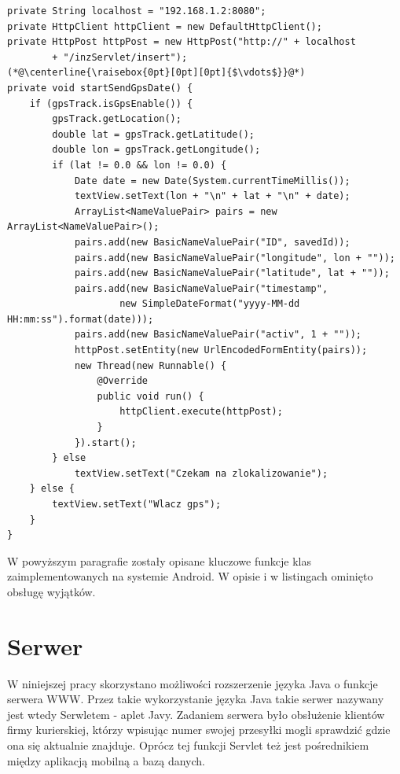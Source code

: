 \documentclass[eng,printmode,oneside]{mgr}
\begin{document}
\begin{lstlisting}[caption=Metoda startSendGpsDate() klasy
main.java. Metoda sprawdza stan sygnału GPS i przygotowuje wiadomość do
wysłania na serwer oraz wysyła ją,label=lst:Main.startSendGpsDate.java]
private String localhost = "192.168.1.2:8080";
private HttpClient httpClient = new DefaultHttpClient();
private HttpPost httpPost = new HttpPost("http://" + localhost
		+ "/inzServlet/insert");
(*@\centerline{\raisebox{0pt}[0pt][0pt]{$\vdots$}}@*)
private void startSendGpsDate() {
	if (gpsTrack.isGpsEnable()) {
		gpsTrack.getLocation();
		double lat = gpsTrack.getLatitude();
		double lon = gpsTrack.getLongitude();
		if (lat != 0.0 && lon != 0.0) {
			Date date = new Date(System.currentTimeMillis());
			textView.setText(lon + "\n" + lat + "\n" + date);
			ArrayList<NameValuePair> pairs = new ArrayList<NameValuePair>();
			pairs.add(new BasicNameValuePair("ID", savedId));
			pairs.add(new BasicNameValuePair("longitude", lon + ""));
			pairs.add(new BasicNameValuePair("latitude", lat + ""));
			pairs.add(new BasicNameValuePair("timestamp",
					new SimpleDateFormat("yyyy-MM-dd HH:mm:ss").format(date)));
			pairs.add(new BasicNameValuePair("activ", 1 + ""));
			httpPost.setEntity(new UrlEncodedFormEntity(pairs));
			new Thread(new Runnable() {
				@Override
				public void run() {
					httpClient.execute(httpPost);
				}
			}).start();
		} else
			textView.setText("Czekam na zlokalizowanie");
	} else {
		textView.setText("Wlacz gps");
	}
}
\end{lstlisting}

W powyższym paragrafie zostały opisane kluczowe funkcje klas zaimplementowanych
na systemie Android. W opisie i w listingach ominięto obsługę wyjątków. 

\section{Serwer}

W niniejszej pracy skorzystano możliwości rozszerzenie języka Java o funkcje
serwera WWW. Przez takie wykorzystanie języka Java takie serwer nazywany jest
wtedy Serwletem - aplet Javy. Zadaniem serwera było obsłużenie klientów firmy
kurierskiej, którzy wpisując numer swojej przesyłki mogli sprawdzić gdzie ona
się aktualnie znajduje. Oprócz tej funkcji Servlet też jest pośrednikiem
między aplikacją mobilną a bazą danych.
\end{document}
